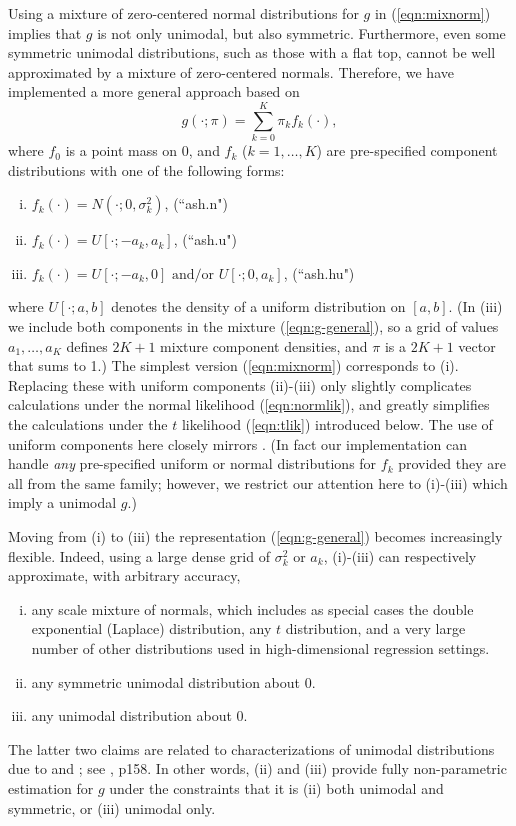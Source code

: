 \documentclass[11pt]{article}
\begin{document}
Using a mixture of zero-centered normal distributions for $g$ in (\ref{eqn:mixnorm}) implies that $g$ is not only unimodal, but also symmetric.
Furthermore, even some symmetric unimodal distributions, such as those with a flat top, cannot be well approximated by a mixture of zero-centered normals.
 Therefore, we have implemented a more general approach based on 
\begin{equation} \label{eqn:g-general}
g(\cdot; \pi) = \sum_{k=0}^K \pi_k f_k(\cdot) ,
\end{equation}
where $f_0$ is a point mass on 0, and $f_k$ ($k=1,\dots,K$) are pre-specified component distributions with one of the following forms: 
\begin{enumerate}[(i)]
\item $f_k(\cdot) = N(\cdot; 0, \sigma^2_k)$, \qquad (``ash.n")
\item $f_k(\cdot) = U[\cdot; -a_k,a_k]$,  \qquad (``ash.u")
\item $f_k(\cdot) = U[\cdot; -a_k,0] \text{ and/or } U[\cdot; 0,a_k]$,  \qquad (``ash.hu")
\end{enumerate}
where $U[\cdot; a,b]$ denotes the density of a uniform distribution on $[a,b]$.
(In (iii) we include both components in the mixture (\ref{eqn:g-general}), so a grid of values $a_1,\dots,a_K$ defines $2K+1$ mixture component densities, 
and $\pi$ is a $2K+1$ vector that sums to 1.)
The simplest version (\ref{eqn:mixnorm}) corresponds to (i).
Replacing these with uniform components (ii)-(iii) only slightly complicates calculations
under the normal likelihood (\ref{eqn:normlik}), and greatly simplifies the calculations under the $t$ likelihood
(\ref{eqn:tlik}) introduced below. The use of uniform components here closely mirrors \cite{cordy1997deconvolution}.
(In fact our implementation can handle {\it any} pre-specified uniform or normal distributions for $f_k$ provided they are all from the same family;
however, we restrict our attention here to (i)-(iii) which imply a unimodal $g$.)

Moving from (i) to (iii) the representation (\ref{eqn:g-general}) becomes increasingly flexible. Indeed,
using a large dense grid of $\sigma^2_k$ or $a_k$, (i)-(iii) can respectively approximate,
with arbitrary accuracy,
\begin{enumerate}[(i)]
\item any scale mixture of normals, which includes as special cases
the double exponential (Laplace) distribution, any $t$ distribution, and a very large number of other distributions used in  high-dimensional regression settings.
\item any symmetric unimodal distribution about 0.
\item any unimodal distribution about 0.
\end{enumerate}
The latter two claims are related to characterizations of unimodal distributions due to \cite{khintchine1938unimodal} and  \cite{shepp1962symmetric}; see \cite{feller1971introduction}, p158. 
In other words, (ii) and (iii) provide fully non-parametric estimation for $g$ under the constraints that it is (ii) both unimodal and symmetric, or (iii) unimodal only.
\end{document}

